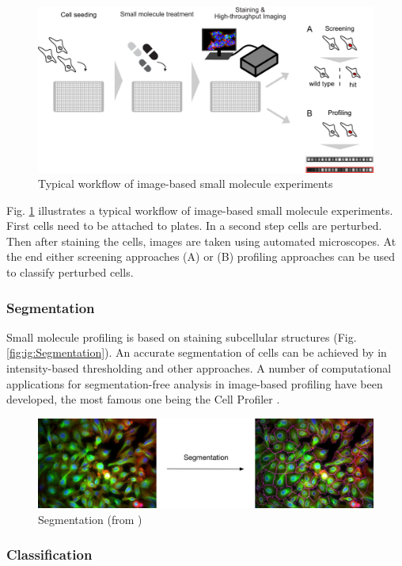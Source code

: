 \begin{figure}[H]
	\centering
	\includegraphics[width=0.8\linewidth]{bilder/cells/hcu.png}
	\caption{Typical workflow of image-based small molecule experiments \cite{Scheeder2018}}
	\label{fig:Workflow}
\end{figure}

Fig. \ref{fig:Workflow} illustrates a typical workflow of image-based small molecule experiments. First cells need to be attached to plates. In a second step cells are perturbed. Then after staining the cells, images are taken using automated microscopes. At the end either screening approaches (A) or (B) profiling approaches can be used to classify perturbed cells.

\subsubsection{Segmentation}

Small molecule profiling is based on staining subcellular structures (Fig. \ref{fig:ig:Segmentation}).
An accurate segmentation of cells can be achieved by in intensity-based thresholding and other approaches. A number of computational applications for segmentation-free analysis in image-based profiling have been developed, the most famous one being the Cell Profiler \cite{CellProfiler}.


\begin{figure}[H]
	\centering
	\includegraphics[width=0.8\linewidth]{bilder/cells/segmentation.png}
	\caption{Segmentation (from \cite{Pau})}
	\label{fig:Segmentation}
\end{figure}


\subsubsection{Classification}


